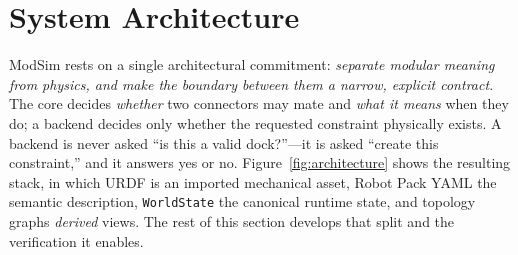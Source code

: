 %
%

\section{System Architecture}
\label{sec:architecture}

ModSim rests on a single architectural commitment: \emph{separate modular
meaning from physics, and make the boundary between them a narrow, explicit
contract.} The core decides \emph{whether} two connectors may mate and \emph{what
it means} when they do; a backend decides only whether the requested constraint
physically exists. A backend is never asked ``is this a valid dock?''---it is
asked ``create this constraint,'' and it answers yes or no.
Figure~\ref{fig:architecture} shows the resulting stack, in which URDF is an
imported mechanical asset, Robot Pack YAML the semantic description,
\texttt{WorldState} the canonical runtime state, and topology graphs
\emph{derived} views. The rest of this section develops that split and the
verification it enables.

